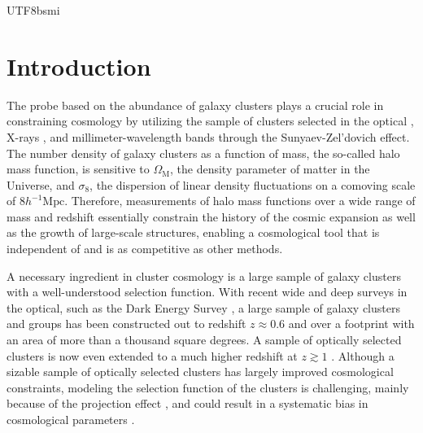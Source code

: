\documentclass[longauth]{aa}
\newcommand{\OmegaM}{\ensuremath{\Omega_{\mathrm{M}}}}
\newcommand{\sigmaeight}{\ensuremath{\sigma_{8}}}
\newcommand{\Mpch}{\ensuremath{h^{-1}\mathrm{Mpc}}}
\newcommand{\redshift}{\ensuremath{z}}
\begin{document}
\begin{CJK*}{UTF8}{bsmi}
%
%



\maketitle

%
%



\section{Introduction}
\label{sec:introduction}


The probe based on the abundance of galaxy clusters plays a crucial role in constraining cosmology by utilizing the sample of clusters selected in the optical \citep{costanzi18,costanzi21,to21}, X-rays \citep{mantz15,schellenberger17,pacaud18}, and millimeter-wavelength bands \citep{PlanckCollaboration2015b,bocquet15,deHaan16,bocquet19} through the Sunyaev-Zel'dovich \citep[SZ;][]{sunyaev72} effect.
The number density of galaxy clusters as a function of mass, the  so-called halo mass function, is sensitive to \OmegaM, the density parameter of matter in the Universe, and \sigmaeight, the dispersion of linear density fluctuations on a comoving scale of $8\Mpch$.
Therefore, measurements of halo mass functions over a wide range of mass and redshift  essentially constrain the history of the cosmic expansion as well as the growth of large-scale structures, enabling a cosmological tool that is independent of and is as competitive as other methods.

A necessary ingredient in cluster cosmology is a large sample of galaxy clusters with a well-understood selection function.
With recent wide and deep surveys in the optical, such as the Dark Energy Survey \citep{des05}, a large sample of galaxy clusters and groups has been constructed out to redshift $\redshift\approx0.6$ and over a footprint with an area of more than a thousand square degrees.
A sample of optically selected clusters is now even extended to a much higher redshift at $\redshift\gtrsim1$ \citep[e.g.,][]{oguri18}.
Although a sizable sample of optically selected clusters has largely improved cosmological constraints, modeling the selection function of the clusters is challenging, mainly because of the projection effect \citep{zu17,costanzi19,sunayama20}, and could result in a systematic bias in cosmological parameters \citep{desclustercosmology20}.



\end{CJK*}
\end{document}
